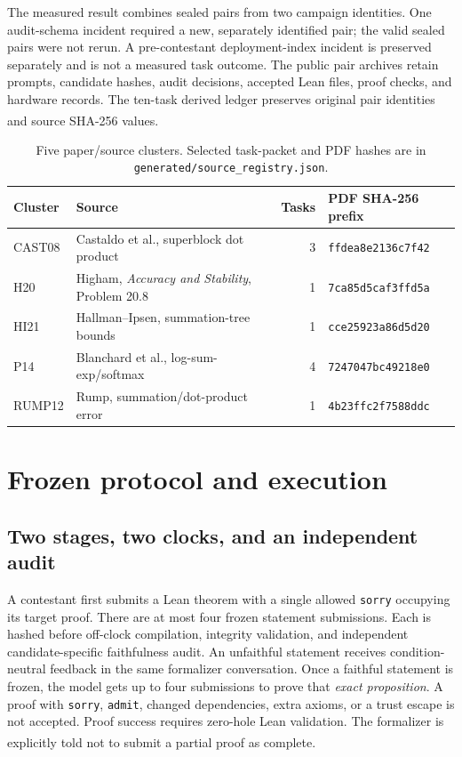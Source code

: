 \documentclass[10pt,a4paper]{article}
\newcommand{\src}[1]{\textsuperscript{\cite{#1}}}
\begin{document}
The measured result combines sealed pairs from two campaign identities. One
audit-schema incident required a new, separately identified pair; the valid
sealed pairs were not rerun. A pre-contestant deployment-index incident is
preserved separately and is not a measured task outcome. The public pair
archives retain prompts, candidate hashes, audit decisions, accepted Lean
files, proof checks, and hardware records. The ten-task derived ledger
preserves original pair identities and source SHA-256 values.\src{taskledger,evidence,recovery}

\begin{table}[ht]\centering\small
\begin{tabular}{@{}llrl@{}}\toprule
Cluster & Source & Tasks & PDF SHA-256 prefix\\\midrule
CAST08 & Castaldo et al., superblock dot product & 3 & \texttt{ffdea8e2136c7f42}\\
H20 & Higham, \emph{Accuracy and Stability}, Problem 20.8 & 1 & \texttt{7ca85d5caf3ffd5a}\\
HI21 & Hallman--Ipsen, summation-tree bounds & 1 & \texttt{cce25923a86d5d20}\\
P14 & Blanchard et al., log-sum-exp/softmax & 4 & \texttt{7247047bc49218e0}\\
RUMP12 & Rump, summation/dot-product error & 1 & \texttt{4b23ffc2f7588ddc}\\
\bottomrule\end{tabular}
\caption{Five paper/source clusters. Selected task-packet and PDF hashes are
in \texttt{generated/source\_registry.json}.\cite{registry,packets}}
\label{tab:papers}
\end{table}

\section{Frozen protocol and execution}

\subsection{Two stages, two clocks, and an independent audit}

A contestant first submits a Lean theorem with a single allowed
\texttt{sorry} occupying its target proof. There are at most four frozen
statement submissions. Each is hashed before off-clock compilation,
integrity validation, and independent candidate-specific faithfulness audit.
An unfaithful statement receives condition-neutral feedback in the same
formalizer conversation. Once a faithful statement is frozen, the model gets
up to four submissions to prove that \emph{exact proposition}. A proof with
\texttt{sorry}, \texttt{admit}, changed dependencies, extra axioms, or a trust
escape is not accepted. Proof success requires zero-hole Lean validation.
The formalizer is explicitly told not to submit a partial proof as complete.
\src{protocol,prompts,taskledger}
\end{document}
